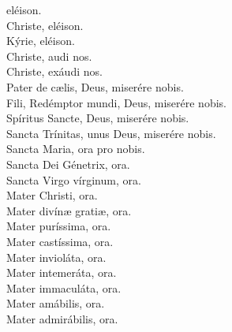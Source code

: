 \documentclass[10pt,a4paper,oneside]{book}
\begin{document}
\begin{minipage}[t]{0.475\textwidth}
      eléison.\\
      Christe, eléison.\\
      Kýrie, eléison.\\
      Christe, audi nos.\\
      Christe, exáudi nos.\\
      Pater de c{\ae}lis, Deus, miserére nobis.\\
      Fili, Redémptor mundi, Deus, miserére nobis.\\
      Spíritus Sancte, Deus, miserére nobis.\\
      Sancta Trínitas, unus Deus, miserére nobis.\\
      Sancta Maria, ora pro nobis.\\
      Sancta Dei Génetrix, ora.\\
      Sancta Virgo vírginum, ora.\\
      Mater Christi, ora.\\
      Mater divín{\ae} grati{\ae}, ora.\\
      Mater puríssima, ora.\\
      Mater castíssima, ora.\\
      Mater invioláta, ora.\\
      Mater intemeráta, ora.\\
      Mater immaculáta, ora.\\
      Mater amábilis, ora.\\
      Mater admirábilis, ora.
\end{minipage}
\end{document}
